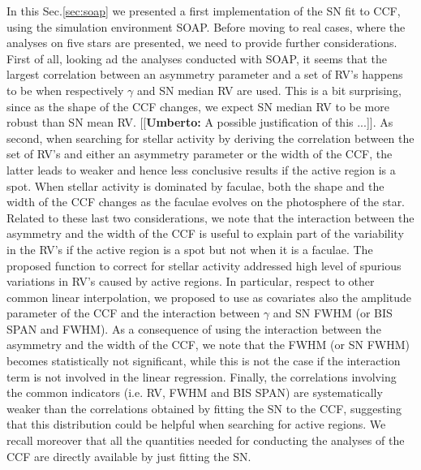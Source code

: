 \documentclass[11pt, oneside]{article}
\newcommand{\umberto}[1]{{\color{green}[[\textbf{Umberto: }#1]]}}
\begin{document}
In this Sec.\ref{sec:soap} we presented a first implementation of the SN fit to CCF, using the simulation environment SOAP. Before moving to real cases, where the analyses on five stars are presented, we need to provide further considerations. First of all, looking ad the analyses conducted with SOAP, it seems that the largest correlation between an asymmetry parameter and a set of RV's happens to be when respectively $\gamma$ and SN median RV are used. This is a bit surprising, since as the shape of the CCF changes, we expect SN median RV to be more robust than SN mean RV. \umberto{A possible justification of this ...}. As second, when searching for stellar activity by deriving the correlation between the set of RV's and either an asymmetry parameter or the width of the CCF, the latter leads to weaker and hence less conclusive results if the active region is a spot. When stellar activity is dominated by faculae, both the shape and the width of the CCF changes as the faculae evolves on the photosphere of the star. Related to these last two considerations, we note that the interaction between the asymmetry and the width of the CCF is useful to explain part of the variability in the RV's if the active region is a spot but not when it is a faculae. The proposed function to correct for stellar activity addressed high level of spurious variations in RV's caused by active regions. In particular, respect to other common linear interpolation, we proposed to use as covariates also the amplitude parameter of the CCF and the interaction between $\gamma$ and SN FWHM (or BIS SPAN and FWHM). As a consequence of using the interaction between the asymmetry and the width of the CCF, we note that the FWHM (or SN FWHM) becomes statistically not significant, while this is not the case if the interaction term is not involved in the linear regression. Finally, the correlations involving the common indicators (i.e. RV, FWHM and BIS SPAN) are systematically weaker than the correlations obtained by fitting the SN to the CCF, suggesting that this distribution could be helpful when searching for active regions. We recall moreover that all the quantities needed for conducting the analyses of the CCF are directly available by just fitting the SN.

\end{document}
